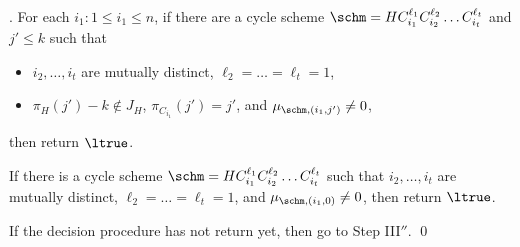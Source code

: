 \medskip

. For each $i_1: 1 \le i_1 \le n$, if there are a cycle scheme $\schm=HC_{i_1}^{\ell_1} C_{i_2}^{\ell_2} \dots C_{i_t}^{\ell_t}$  and $j' \le k$ such that 
\begin{itemize}
\item $i_2,\dots,i_t$ are mutually distinct, $\ell_2 = \dots = \ell_t = 1$, 
%
\item $\pi_H(j')-k \not \in J_H$, $\pi_{C_{i_1}}(j')=j'$, and $\mu_{\schm,(i_1,j')} \neq 0$, 
\end{itemize}
then return $\ltrue$.

If there is a cycle scheme $\schm=HC_{i_1}^{\ell_1} C_{i_2}^{\ell_2} \dots C_{i_t}^{\ell_t}$ such that 
$i_2,\dots,i_t$ are mutually distinct, $\ell_2 = \dots = \ell_t = 1$, 
%
and $\mu_{\schm,(i_1,0)} \neq 0$, 
%
then return $\ltrue$. 

If the decision procedure has not return yet, then go to Step III$''$. \qed

\medskip


